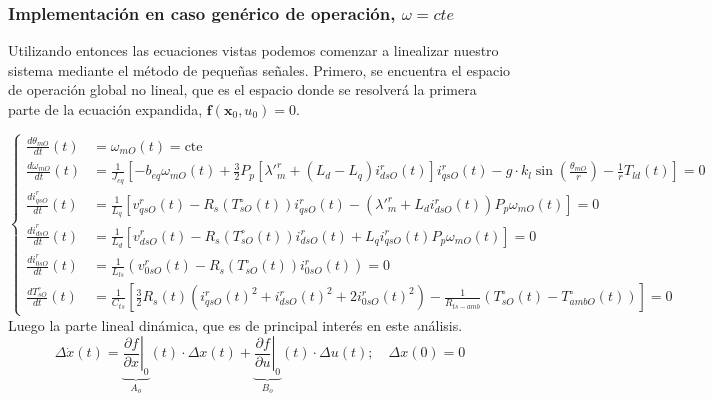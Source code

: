 \documentclass[12pt, a4paper,journal, onecolumn, compsoc]{IEEEtran}
\begin{document}
\subsubsection{Implementación en caso genérico de operación, \(\omega=cte\)}
Utilizando entonces las ecuaciones vistas podemos comenzar a linealizar nuestro sistema mediante el método de pequeñas señales.
Primero, se encuentra el espacio de operación global no lineal, que es el espacio donde se resolverá la primera parte de la ecuación expandida, $\bm{f}(\bm{x}_0,u_0)=0$.

\begin{equation}
\left\{
    \begin{aligned}
        \frac{d\theta_{mO}}{dt}(t) &= \omega_{mO}(t) = \text{cte} \\[10pt]
        \frac{d\omega_{mO}}{dt}(t) &= \frac{1}{J_{eq}} \left[ -b_{eq}\omega_{mO}(t) + \frac{3}{2}P_p \left[ \lambda'^r_m + (L_d - L_q)i_{dsO}^r(t) \right] i_{qsO}^r(t) - g \cdot k_l \sin\left(\frac{\theta_{mO}}{r}\right) - \frac{1}{r}T_{ld}(t) \right] = 0 \\[10pt]
        \frac{di_{qsO}^r}{dt}(t) &= \frac{1}{L_q} \left[ v_{qsO}^r(t) - R_s(T_{sO}^\circ(t))i_{qsO}^r(t) - (\lambda'^r_m + L_d i_{dsO}^r(t))P_p \omega_{mO}(t) \right] = 0 \\[10pt]
        \frac{di_{dsO}^r}{dt}(t) &= \frac{1}{L_d} \left[ v_{dsO}^r(t) - R_s(T_{sO}^\circ(t))i_{dsO}^r(t) + L_q i_{qsO}^r(t)P_p \omega_{mO}(t) \right] = 0 \\[10pt]
        \frac{di_{0sO}^r}{dt}(t) &= \frac{1}{L_{ls}} \left( v_{0sO}^r(t) - R_s(T_{sO}^\circ(t))i_{0sO}^r(t) \right) = 0 \\[10pt]
        \frac{dT_{sO}^\circ}{dt}(t) &= \frac{1}{C_{ts}} \left[ \frac{3}{2}R_s(t) \left( i_{qsO}^r(t)^2 + i_{dsO}^r(t)^2 + 2i_{0sO}^r(t)^2 \right) - \frac{1}{R_{ts-amb}} (T_{sO}^\circ(t) - T_{ambO}^\circ(t)) \right] = 0
    \end{aligned}
\right.
\end{equation}
Luego la parte lineal dinámica, que es de principal interés en este análisis.
\begin{equation*}
    \Delta \dot{x}(t) = \underbrace{\left. \frac{\partial f}{\partial x} \right|_0}_{A_o} (t) \cdot \Delta x(t) + \underbrace{\left. \frac{\partial f}{\partial u} \right|_0}_{B_o} (t) \cdot \Delta u(t); \quad \Delta x(0) = 0
\end{equation*}
\end{document}
